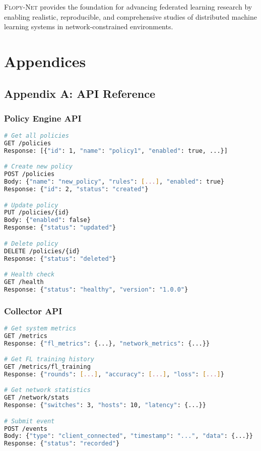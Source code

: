 \documentclass[12pt,a4paper,twoside]{article}
\newcommand{\flopynet}{\textsc{Flopy-Net}}
\begin{document}
\flopynet{} provides the foundation for advancing federated learning research by enabling realistic, reproducible, and comprehensive studies of distributed machine learning systems in network-constrained environments.

\section{Appendices}

\subsection{Appendix A: API Reference}

\subsubsection{Policy Engine API}

\begin{lstlisting}[language=bash, caption=Policy Engine Endpoints]
# Get all policies
GET /policies
Response: [{"id": 1, "name": "policy1", "enabled": true, ...}]

# Create new policy
POST /policies
Body: {"name": "new_policy", "rules": [...], "enabled": true}
Response: {"id": 2, "status": "created"}

# Update policy
PUT /policies/{id}
Body: {"enabled": false}
Response: {"status": "updated"}

# Delete policy
DELETE /policies/{id}
Response: {"status": "deleted"}

# Health check
GET /health
Response: {"status": "healthy", "version": "1.0.0"}
\end{lstlisting}

\subsubsection{Collector API}

\begin{lstlisting}[language=bash, caption=Collector Service Endpoints]
# Get system metrics
GET /metrics
Response: {"fl_metrics": {...}, "network_metrics": {...}}

# Get FL training history
GET /metrics/fl_training
Response: {"rounds": [...], "accuracy": [...], "loss": [...]}

# Get network statistics
GET /network/stats
Response: {"switches": 3, "hosts": 10, "latency": {...}}

# Submit event
POST /events
Body: {"type": "client_connected", "timestamp": "...", "data": {...}}
Response: {"status": "recorded"}
\end{lstlisting}
\end{document}
